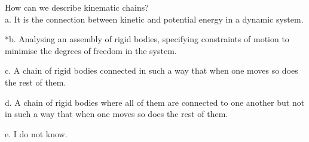 
How can we describe kinematic chains? \\

a. It is the connection between kinetic and potential energy in a dynamic system.

*b. Analysing an assembly of rigid bodies, specifying constraints of motion to minimise the degrees of freedom in the system.

c. A chain of rigid bodies connected in such a way that when one moves so does the rest of them. 
 
d. A chain of rigid bodies where all of them are connected to one another but not in such a way that when one moves so does the rest of them.

e. I do not know. \\
